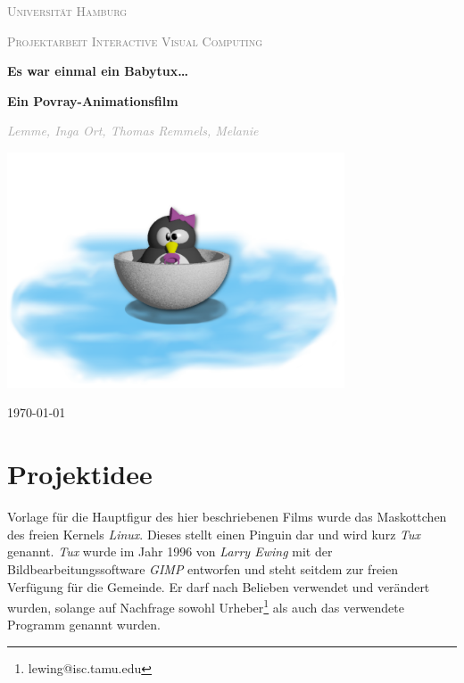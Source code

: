 \documentclass[11pt,parskip]{scrartcl}
\begin{document}
%
\begin{titlepage}
  \begin{sffamily}
    {\scshape\LARGE \textcolor{gray}{Universität Hamburg}\par}
    {\scshape\Large \textcolor{gray}{Projektarbeit Interactive Visual
        Computing}\par}
    \vspace{2.5cm}
    \centering
    {\huge\bfseries Es war einmal ein Babytux\ldots\par}
    {\large\bfseries Ein Povray-Animationsfilm\par}
    \vspace{1.5cm}
    {\Large\itshape \textcolor{darkgray}{
        Lemme, Inga \quad{}
        Ort, Thomas \quad{}
        Remmels, Melanie
      }\par
    }
    \vfill
    \includegraphics[width=0.75\textwidth]{./fig/ourtux4.pdf}\par\vspace{1cm}
    \vfill
    {\large \today\par}
  \end{sffamily}
\end{titlepage}
%


\newpage
\tableofcontents
\newpage


\section{Projektidee}
Vorlage für die Hauptfigur des hier beschriebenen Films wurde das Maskottchen des
freien Kernels \emph{Linux}. Dieses stellt einen Pinguin dar und wird kurz
\emph{Tux} genannt. \emph{Tux} wurde im Jahr 1996 von \emph{Larry Ewing} mit
der Bildbearbeitungssoftware \emph{GIMP} entworfen und steht seitdem zur freien
Verfügung für die Gemeinde. Er darf nach Belieben verwendet und verändert
wurden, solange auf Nachfrage sowohl Urheber\footnote{lewing@isc.tamu.edu} als
auch das verwendete Programm genannt wurden. \cite{ewing}
\end{document}
